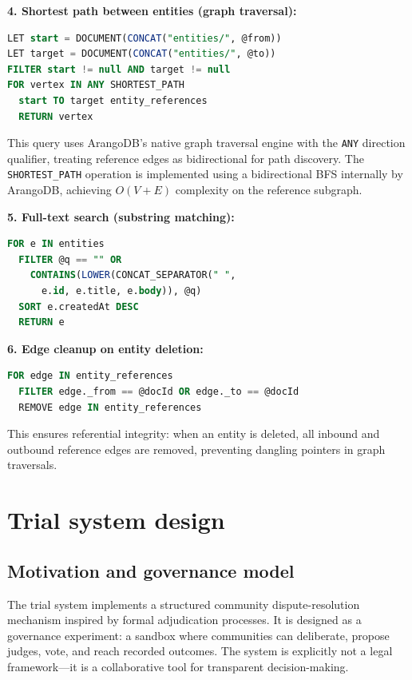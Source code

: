 \documentclass[13pt,a4paper]{report}
\begin{document}
\textbf{4. Shortest path between entities (graph traversal):}
\begin{lstlisting}[language=SQL,caption={Degree-of-separation query},label={lst:shortest-path}]
LET start = DOCUMENT(CONCAT("entities/", @from))
LET target = DOCUMENT(CONCAT("entities/", @to))
FILTER start != null AND target != null
FOR vertex IN ANY SHORTEST_PATH
  start TO target entity_references
  RETURN vertex
\end{lstlisting}
This query uses ArangoDB's native graph traversal engine with the \texttt{ANY} direction qualifier, treating reference edges as bidirectional for path discovery. The \texttt{SHORTEST\_PATH} operation is implemented using a bidirectional BFS internally by ArangoDB, achieving $O(V + E)$ complexity on the reference subgraph.

\textbf{5. Full-text search (substring matching):}
\begin{lstlisting}[language=SQL,caption={Full-text search query},label={lst:fulltext}]
FOR e IN entities
  FILTER @q == "" OR
    CONTAINS(LOWER(CONCAT_SEPARATOR(" ",
      e.id, e.title, e.body)), @q)
  SORT e.createdAt DESC
  RETURN e
\end{lstlisting}

\textbf{6. Edge cleanup on entity deletion:}
\begin{lstlisting}[language=SQL,caption={Reference edge cleanup},label={lst:edge-cleanup}]
FOR edge IN entity_references
  FILTER edge._from == @docId OR edge._to == @docId
  REMOVE edge IN entity_references
\end{lstlisting}
This ensures referential integrity: when an entity is deleted, all inbound and outbound reference edges are removed, preventing dangling pointers in graph traversals.

\section{Trial system design}
\subsection{Motivation and governance model}
The trial system implements a structured community dispute-resolution mechanism inspired by formal adjudication processes. It is designed as a governance experiment: a sandbox where communities can deliberate, propose judges, vote, and reach recorded outcomes. The system is explicitly not a legal framework---it is a collaborative tool for transparent decision-making.
\end{document}
